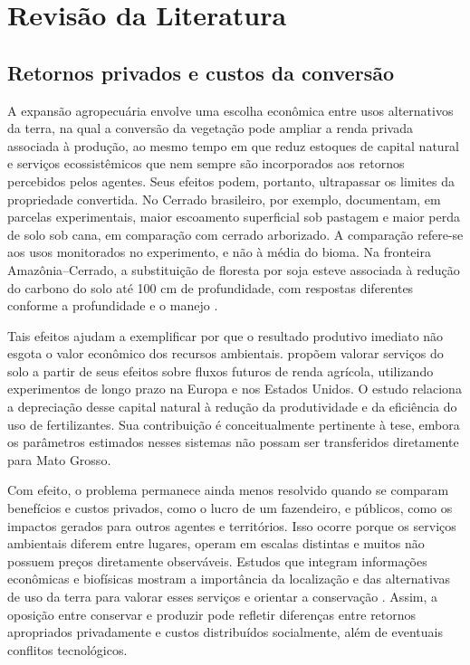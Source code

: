 \section{Revisão da Literatura}
\label{sec:literatura}

\subsection{Retornos privados e custos da conversão}

A expansão agropecuária envolve uma escolha econômica entre usos alternativos da terra, na qual a conversão da vegetação pode ampliar a renda privada associada à produção, ao mesmo tempo em que reduz estoques de capital natural e serviços ecossistêmicos que nem sempre são incorporados aos retornos percebidos pelos agentes. Seus efeitos podem, portanto, ultrapassar os limites da propriedade convertida. No Cerrado brasileiro, por exemplo,  documentam, em parcelas experimentais, maior escoamento superficial sob pastagem e maior perda de solo sob cana, em comparação com cerrado arborizado. A comparação refere-se aos usos monitorados no experimento, e não à média do bioma. Na fronteira Amazônia--Cerrado, a substituição de floresta por soja esteve associada à redução do carbono do solo até 100 cm de profundidade, com respostas diferentes conforme a profundidade e o manejo \cite{Popin2025}.

Tais efeitos ajudam a exemplificar por que o resultado produtivo imediato não esgota o valor econômico dos recursos ambientais.  propõem valorar serviços do solo a partir de seus efeitos sobre fluxos futuros de renda agrícola, utilizando experimentos de longo prazo na Europa e nos Estados Unidos. O estudo relaciona a depreciação desse capital natural à redução da produtividade e da eficiência do uso de fertilizantes. Sua contribuição é conceitualmente pertinente à tese, embora os parâmetros estimados nesses sistemas não possam ser transferidos diretamente para Mato Grosso.

Com efeito, o problema permanece ainda menos resolvido quando se comparam benefícios e custos privados, como o lucro de um fazendeiro, e públicos, como os impactos gerados para outros agentes e territórios. Isso ocorre porque os serviços ambientais diferem entre lugares, operam em escalas distintas e muitos não possuem preços diretamente observáveis. Estudos que integram informações econômicas e biofísicas mostram a importância da localização e das alternativas de uso da terra para valorar esses serviços e orientar a conservação \cite{Crossman2009,Gascoigne2011}. Assim, a oposição entre conservar e produzir pode refletir diferenças entre retornos apropriados privadamente e custos distribuídos socialmente, além de eventuais conflitos tecnológicos.

